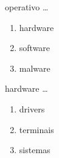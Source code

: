%
%
%
%
%
\begin{diapo} \begin{frame}{ operativo   \dots} 
\begin{enumerate}
	\item hardware\pause
	\item software \pause
	\item malware 
\end{enumerate} \end{frame}  \end{diapo}  
\begin{diapo}\begin{frame}{ hardware   \dots}
\begin{enumerate}
	\item drivers \pause
	\item terminais \pause
	\item sistemas 
\end{enumerate} \end{frame} \end{diapo}

